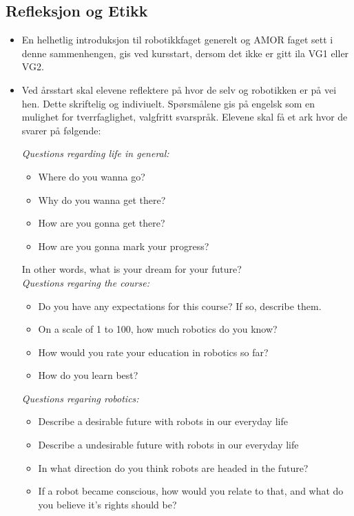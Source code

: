 \subsection{Refleksjon og Etikk}

    \begin{itemize}
        \item En helhetlig introduksjon til robotikkfaget generelt og AMOR faget sett i denne sammenhengen, gis ved kursstart, dersom det ikke er gitt ila VG1 eller VG2.
        \item Ved årsstart skal elevene reflektere på hvor de selv og robotikken er på vei hen. Dette skriftelig og indiviuelt. Spørsmålene gis på engelsk som en mulighet for tverrfaglighet, valgfritt svarspråk. Elevene skal få et ark hvor de svarer på følgende:

            \emph{Questions regarding life in general:}
            \begin{itemize}


                \item Where do you wanna go?
                \item Why do you wanna get there?
                \item How are you gonna get there?
                \item How are you gonna mark your progress?

            \end{itemize}
            In other words, what is your dream for your future?\\

            \emph{Questions regaring the course:}
            \begin{itemize}

                \item Do you have any expectations for this course? If so, describe them.
                \item On a scale of 1 to 100, how much robotics do you know?
                \item How would you rate your education in robotics so far?
                \item How do you learn best?

            \end{itemize}

            \emph{Questions regaring robotics:}
            \begin{itemize}

                \item Describe a desirable future with robots in our everyday life
                \item Describe a undesirable future with robots in our everyday life
                \item In what direction do you think robots are headed in the future?
                \item If a robot became conscious, how would you relate to that, and what do you believe it's rights should be?


\end{itemize}
\end{itemize}
